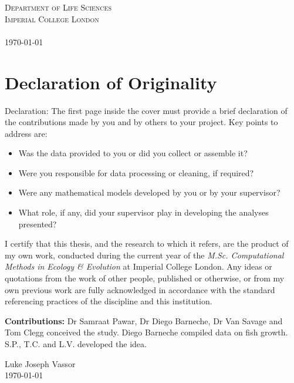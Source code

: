 \documentclass[a4paper]{article} %
\begin{document}
\begin{titlepage}
    \textsc{Department of Life Sciences \\ Imperial College London \\ \ }\\[1cm]
    \textsc{\today}\\[2cm] %
    
    \vfill %
    
\end{titlepage}

\section*{Declaration of Originality}\thispagestyle{empty}
    Declaration: The first page inside the cover must provide a brief declaration of the contributions
    made by you and by others to your project. Key points to address are:
    \begin{itemize}
        \item Was the data provided to you or did you collect or assemble it?
        \item Were you responsible for data processing or cleaning, if required?
        \item Were any mathematical models developed by you or by your supervisor?
        \item What role, if any, did your supervisor play in developing the analyses presented?
    \end{itemize}
    I certify that this thesis, and the research to which it refers, are the product of my own work, conducted during the current year of the \emph{M.Sc. Computational Methods in Ecology \& Evolution} at Imperial College London. Any ideas or quotations from the work of other people, published or otherwise, or from my own previous work are fully acknowledged in accordance with the standard referencing practices of the discipline and this institution.

    \textbf{Contributions:} Dr Samraat Pawar, Dr Diego Barneche, Dr Van Savage and Tom Clegg conceived the study. Diego Barneche compiled data on fish growth. S.P., T.C. and L.V. developed the idea.
    \vspace{3cm}
    \begin{flushright}
        Luke Joseph Vassor \\
        \today
    \end{flushright}
\end{document}
